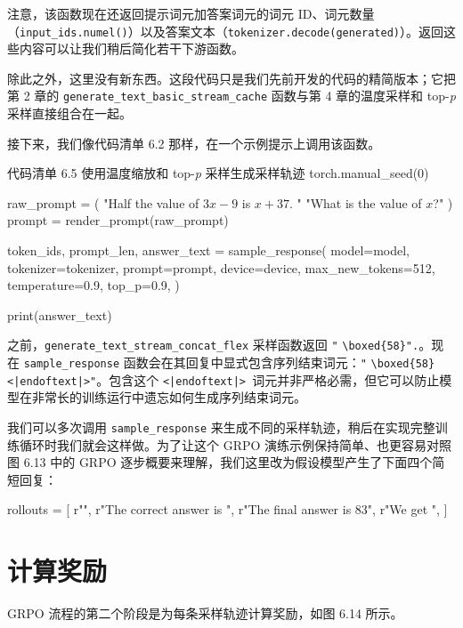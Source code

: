 注意，该函数现在还返回提示词元加答案词元的词元 ID、词元数量（\texttt{input\_ids.numel()}）以及答案文本（\texttt{tokenizer.decode(generated)}）。返回这些内容可以让我们稍后简化若干下游函数。

除此之外，这里没有新东西。这段代码只是我们先前开发的代码的精简版本；它把第 2 章的 \texttt{generate\_text\_basic\_stream\_cache} 函数与第 4 章的温度采样和 top-\emph{p} 采样直接组合在一起。

接下来，我们像代码清单 6.2 那样，在一个示例提示上调用该函数。

\begin{codeboxt}{代码清单 6.5 使用温度缩放和 top-\emph{p} 采样生成采样轨迹}
torch.manual_seed(0)

raw_prompt = (
    "Half the value of $3x-9$ is $x+37$. "
    "What is the value of $x$?"
)
prompt = render_prompt(raw_prompt)

token_ids, prompt_len, answer_text = sample_response(
            model=model,
            tokenizer=tokenizer,
            prompt=prompt,
            device=device,
            max_new_tokens=512,
            temperature=0.9,
            top_p=0.9,
        )

print(answer_text)
\end{codeboxt}

之前，\texttt{generate\_text\_stream\_concat\_flex} 采样函数返回 \texttt{"} \texttt{\textbackslash boxed\{58\}}\texttt{"}\texttt{.}。现在 \texttt{sample\_response} 函数会在其回复中显式包含序列结束词元：\texttt{"} \texttt{\textbackslash boxed\{58\}\textless{}|endoftext|\textgreater{}}\texttt{"}。包含这个 \texttt{\textless{}|endoftext|\textgreater{} }词元并非严格必需，但它可以防止模型在非常长的训练运行中遗忘如何生成序列结束词元。

我们可以多次调用 \texttt{sample\_response} 来生成不同的采样轨迹，稍后在实现完整训练循环时我们就会这样做。为了让这个 GRPO 演练示例保持简单、也更容易对照图 6.13 中的 GRPO 逐步概要来理解，我们这里改为假设模型产生了下面四个简短回复：

\begin{codebox}
rollouts = [
    r"",
    r"The correct answer is ",
    r"The final answer is 83",
    r"We get ",
]
\end{codebox}

\section{计算奖励}

GRPO 流程的第二个阶段是为每条采样轨迹计算奖励，如图 6.14 所示。

